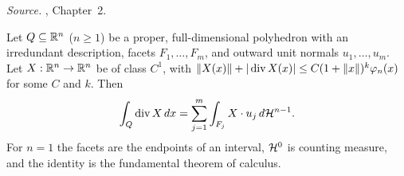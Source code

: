 \emph{Source.} , Chapter~2.

\begin{fact}\label{tb:divergence}
Let \(Q\subseteq\mathbb R^n\) (\(n\ge1\)) be a proper, full-dimensional polyhedron
with an irredundant description, facets \(F_1,\ldots,F_m\), and outward unit
normals \(u_1,\ldots,u_m\). Let \(X:\mathbb R^n\to\mathbb R^n\) be of class \(C^1\), with
\(\left\lVert X(x)\right\rVert+|\operatorname{div}X(x)|\le C(1+\left\lVert x\right\rVert)^k\varphi_n(x)\) for
some \(C\) and \(k\). Then
\[
 \int_Q\operatorname{div}X\,dx=\sum_{j=1}^m\int_{F_j}X\cdot u_j\,d\mathcal H^{n-1}.
\]
For \(n=1\) the facets are the endpoints of an interval, \(\mathcal H^0\) is
counting measure, and the identity is the fundamental theorem of calculus.
\end{fact}

